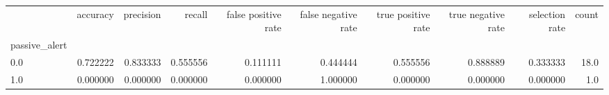 \begin{tabular}{lrrrrrrrrr}
\toprule
{} &  accuracy &  precision &    recall &  false positive rate &  false negative rate &  true positive rate &  true negative rate &  selection rate &  count \\
passive\_alert &           &            &           &                      &                      &                     &                     &                 &        \\
\midrule
0.0           &  0.722222 &   0.833333 &  0.555556 &             0.111111 &             0.444444 &            0.555556 &            0.888889 &        0.333333 &   18.0 \\
1.0           &  0.000000 &   0.000000 &  0.000000 &             0.000000 &             1.000000 &            0.000000 &            0.000000 &        0.000000 &    1.0 \\
\bottomrule
\end{tabular}
